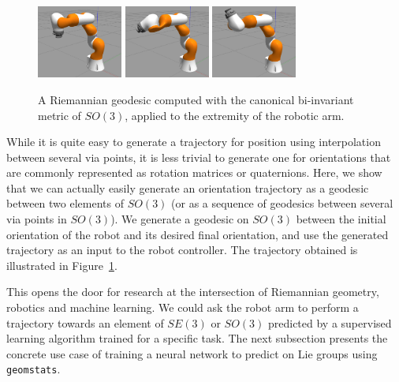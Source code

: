 \documentclass{article}
\begin{document}
\begin{figure}[h]
    \centering
    \includegraphics[width = 0.25\textwidth]{Images/robot3.png}
    \includegraphics[width = 0.25\textwidth]{Images/robot4.png}
    \includegraphics[width = 0.25\textwidth]{Images/robot5.png}
    \caption{A Riemannian geodesic computed with the canonical bi-invariant metric of $SO(3)$, applied to the extremity of the robotic arm.}
    \label{fig:robot}
\end{figure}


While it is quite easy to generate a trajectory for position using interpolation between several via points, it is less trivial to generate one for orientations that are commonly represented as rotation matrices or quaternions. Here, we show that we can actually easily generate an orientation trajectory as a geodesic between two elements of $SO(3)$ (or as a sequence of geodesics between several via points in $SO(3)$). We generate a geodesic on $SO(3)$ between the initial orientation of the robot and its desired final orientation, and use the generated trajectory as an input to the robot controller. The trajectory obtained is illustrated in Figure~\ref{fig:robot}.

This opens the door for research at the intersection of Riemannian geometry, robotics and machine learning. We could ask the robot arm to perform a trajectory towards an element of $SE(3)$ or $SO(3)$ predicted by a supervised learning algorithm trained for a specific task. The next subsection presents the concrete use case of training a neural network to predict on Lie groups using \texttt{geomstats}.
\end{document}
